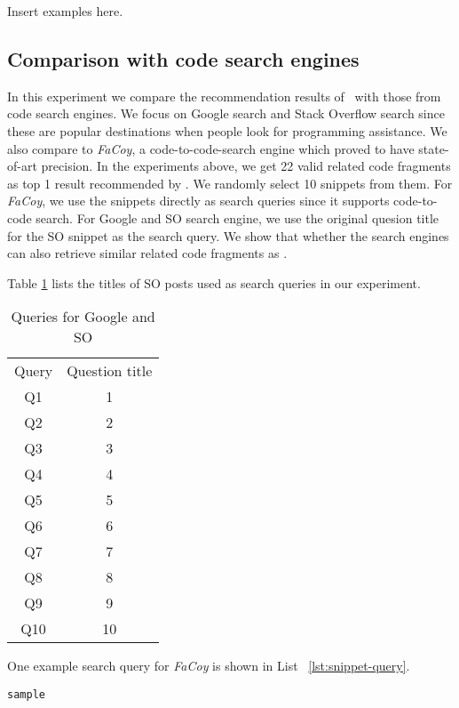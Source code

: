 Insert examples here.

\subsection{Comparison with code search engines}
In this experiment we compare the recommendation results of \tool\ with those from code search engines. We focus on Google search and Stack Overflow search since these are popular destinations when people look for programming assistance. We also compare to \textit{FaCoy}, a code-to-code-search engine which proved to have state-of-art precision. In the experiments above, we get 22 valid related code fragments as top 1 result recommended by \tool. We randomly select 10 snippets from them. For \textit{FaCoy}, we use the snippets directly as search queries since it supports code-to-code search. For Google and SO search engine, we use the original quesion title for the SO snippet as the search query. We show that whether the search engines can also retrieve similar related code fragments as \tool. 

Table \ref{tab:so-questions} lists the titles of SO posts used as search queries in our experiment.

\begin{table}
	\begin{center}
		\begin{tabular}{ c|c } 
			Query & Question title \\ 
			Q1 &  1\\\hline 
			Q2 &  2 \\ \hline
			Q3 &  3 \\ \hline
			Q4 &  4 \\ \hline
			Q5 &  5 \\ \hline
			Q6 &  6 \\ \hline
			Q7 &  7	\\ \hline
			Q8 &  8	\\ \hline
			Q9 &  9	\\ \hline
			Q10 & 10\\ \hline
		\end{tabular}		
	\end{center}
	\caption{Queries for Google and SO}
	\label{tab:so-questions}
\end{table}

One example search query for \textit{FaCoy} is shown in List ~\ref{lst:snippet-query}.
\begin{lstlisting}[label={lst:snippet-query}]
	sample
\end{lstlisting}
